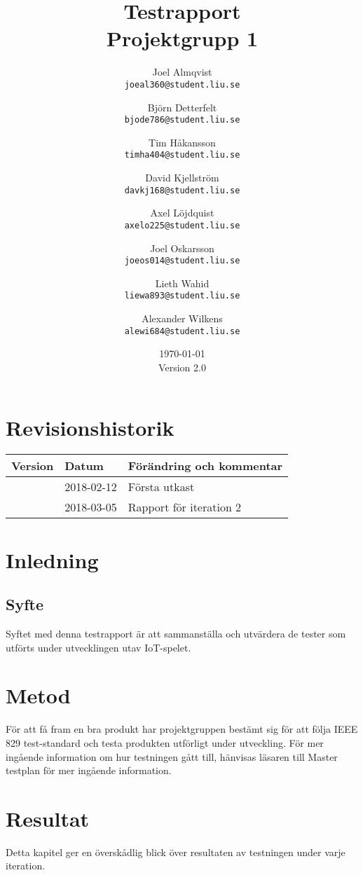 \documentclass[10pt]{article}
\title{Testrapport\\
    \large Projektgrupp 1}
\author{
    Joel Almqvist\\
    \texttt{joeal360@student.liu.se}
    \and
    Björn Detterfelt\\
    \texttt{bjode786@student.liu.se}
    \and
    Tim Håkansson\\
    \texttt{timha404@student.liu.se}
    \and
    David Kjellström\\
    \texttt{davkj168@student.liu.se}
    \and
    Axel Löjdquist\\
    \texttt{axelo225@student.liu.se}
    \and
    Joel Oskarsson\\
    \texttt{joeos014@student.liu.se}
    \and
    Lieth Wahid\\
    \texttt{liewa893@student.liu.se}
    \and
    Alexander Wilkens\\
    \texttt{alewi684@student.liu.se}
}
\date{\today \\Version 2.0}
\begin{document}



\maketitle
\pagebreak
	\section*{Revisionshistorik}

	
	\begin{center}
 	   \begin{tabular}{| l | l | p{12cm} |  }
 	       \hline
 	       \textbf{Version} & \textbf{Datum} & \textbf{Förändring och kommentar} \\
 	       \hline
			\centering 0.1 & 2018-02-12 & Första utkast\\
 	       \hline
 	       \centering 2.0 & 2018-03-05 & Rapport för iteration 2\\
		\hline
 	   \end{tabular}
	\end{center}

	
	
\pagebreak
\tableofcontents
\pagebreak
{}

\section{Inledning}

\subsection{Syfte}
Syftet med denna testrapport är att sammanställa och utvärdera de tester som utförts under utvecklingen utav IoT-spelet. 
  

\section{Metod}
 För att få fram en bra produkt har projektgruppen bestämt sig för att följa IEEE 829 test-standard \cite{ieee829} och testa produkten utförligt under utveckling. För mer ingående information om hur testningen gått till, hänvisas läsaren till Master testplan \cite{bib-mastertestplan} för mer ingående information.
\section{Resultat}
Detta kapitel ger en överskådlig blick över resultaten av testningen under varje iteration.
\end{document}

